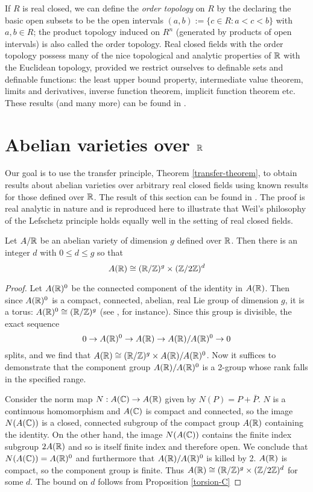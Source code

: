 If $R$ is real closed, we can define the \emph{order topology} on $R$ by the declaring the basic open subsets to be the open intervals $(a,b):=\{c\in R: a<c<b\}$ with $a,b\in R$; the product topology induced on $R^n$ (generated by products of open intervals) is also called the order topology. Real closed fields with the order topology possess many of the nice topological and analytic properties of $\mathbb{R}$ with the Euclidean topology, provided we restrict ourselves to definable sets and definable functions: the least upper bound property, intermediate value theorem, limits and derivatives, inverse function theorem, implicit function theorem etc. These results (and many more) can be found in \cite{real}.

\section{Abelian varieties over $\mathbb{R}$}
Our goal is to use the transfer principle, Theorem \ref{transfer-theorem}, to obtain results about abelian varieties over arbitrary real closed fields using known results for those defined over $\mathbb{R}$.
The result of this section can be found in \cite{gross-harris}. The proof is real analytic in nature and is reproduced here to illustrate that Weil's philosophy of the Lefschetz principle holds equally well in the setting of real closed fields.

\begin{theorem}
\label{structure-of-real-AVs}
Let $A/\mathbb{R}$ be an abelian variety of dimension $g$ defined over $\mathbb{R}$. Then there is an integer $d$ with $0\leq d\leq g$ so that $$A(\mathbb{R})\cong (\mathbb{R}/\mathbb{Z})^g \times (\mathbb{Z}/2\mathbb{Z})^d$$
\end{theorem}
\begin{proof}
Let $A(\mathbb{R})^0$ be the connected component of the identity in $A(\mathbb{R})$. Then since $A(\mathbb{R})^0$ is a compact, connected, abelian, real Lie group of dimension $g$, it is a torus: $A(\mathbb{R})^0\cong (\mathbb{R}/\mathbb{Z})^g$ (see \cite{compactliegroups}, for instance). Since this group is divisible, the exact sequence $$0\rightarrow A(\mathbb{R})^0 \rightarrow A(\mathbb{R})\rightarrow A(\mathbb{R})/A(\mathbb{R})^0\rightarrow 0$$ splits, and we find that $A(\mathbb{R})\cong (\mathbb{R}/\mathbb{Z})^g\times A(\mathbb{R})/A(\mathbb{R})^0$. Now it suffices to demonstrate that the component group $A(\mathbb{R})/A(\mathbb{R})^0$ is a 2-group whose rank falls in the specified range.

Consider the norm map $N:A(\mathbb{C})\rightarrow A(\mathbb{R})$ given by $N(P)=P+\bar{P}$. $N$ is a continuous homomorphism and $A(\mathbb{C})$ is compact and connected, so the image $N(A(\mathbb{C}))$ is a closed, connected subgroup of the compact group $A(\mathbb{R})$ containing the identity. On the other hand, the image $N(A(\mathbb{C}))$ contains the finite index subgroup $2A(\mathbb{R})$ and so is itself finite index and therefore open. We conclude that $N(A(\mathbb{C}))=A(\mathbb{R})^0$ and furthermore that $A(\mathbb{R})/A(\mathbb{R})^0$ is killed by 2. $A(\mathbb{R})$ is compact, so the component group is finite. Thus $A(\mathbb{R})\cong (\mathbb{R}/\mathbb{Z})^g\times (\mathbb{Z}/2\mathbb{Z})^d$ for some $d$. The bound on $d$ follows from Proposition \ref{torsion-C}
\end{proof}

